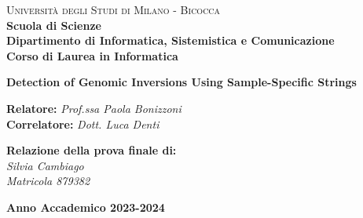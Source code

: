 \begin{titlepage}
        
        \noindent
        \begin{minipage}[t]{0.19\textwidth}
        \end{minipage}
        \begin{minipage}[t]{0.81\textwidth}
        {
                {\textsc{Università degli Studi di Milano - Bicocca}} \\
                \textbf{Scuola di Scienze} \\
                \textbf{Dipartimento di Informatica, Sistemistica e Comunicazione} \\
                \textbf{Corso di Laurea in Informatica} \\
                \par
        }
        \end{minipage}
        
	\vspace{40mm}
  
  \begin{center}
     {\Huge{
            \textbf{Detection of Genomic Inversions Using Sample-Specific Strings}
            \par
            }}
  \end{center}
  
  \vspace{40mm}

  \noindent
  {\large \textbf{Relatore:} \textit{Prof.ssa Paola Bonizzoni} } \\
  
  \noindent
  {\large \textbf{Correlatore:} \textit{Dott. Luca Denti}}
  
  \vspace{15mm}

  \begin{flushright}
  
    \textbf{\large Relazione della prova finale di:} \\
    \large{\textit{Silvia Cambiago}}\\
    \large{\textit{Matricola 879382}}
  \end{flushright}
  
  \vspace{40mm}
  \begin{center}
    {\large{\bf Anno Accademico 2023-2024}}
  \end{center}
  
\end{titlepage}
\restoregeometry